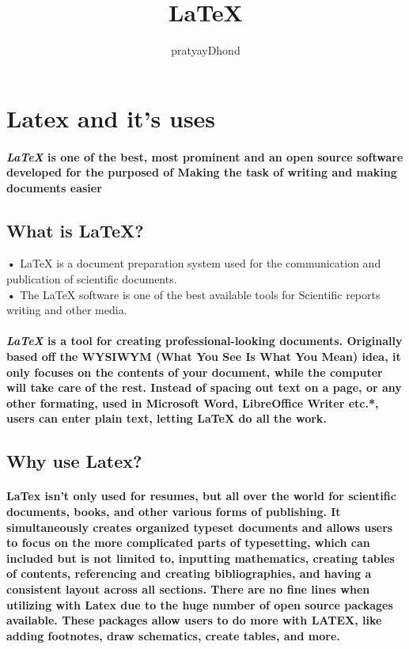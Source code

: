 \documentclass[12pt]{article}
\author{pratyayDhond}
\title{LaTeX}
\begin{document}
\maketitle

\tableofcontents 

\section{Latex and it's uses}
\vspace{.2in}

\paragraph{ \textit{LaTeX} is one of the best, most prominent and an open source software developed for the purposed of Making the task of writing and making documents easier }

\subsection{What is LaTeX?}
		\textbf{•} LaTeX is a document preparation system used for the communication and publication of scientific documents. \\
		\textbf{•} The LaTeX software is one of the best available tools for Scientific reports writing and other media. 
		\paragraph { \textit{LaTeX} is a tool for creating professional-looking documents. Originally based off the WYSIWYM (What You See Is What You Mean) idea, it only focuses on the contents of your document, while the computer will take care of the rest. Instead of spacing out text on a page, or any other formating, used in Microsoft Word, LibreOffice Writer etc.*, users can enter plain text, letting LaTeX do all the work. }

\newpage
\subsection{Why use Latex?}

	\paragraph{LaTex isn't only used for resumes, but all over the world for scientific documents, books, and other various forms of publishing. It simultaneously creates organized typeset documents and allows users to focus on the more complicated parts of typesetting, which can included but is not limited to, inputting mathematics, creating tables of contents, referencing and creating bibliographies, and having a consistent layout across all sections. There are no fine lines when utilizing with Latex due to the huge number of open source packages available. These packages allow users to do more with LATEX, like adding footnotes, draw schematics, create tables, and more.}
	
\end{document}
